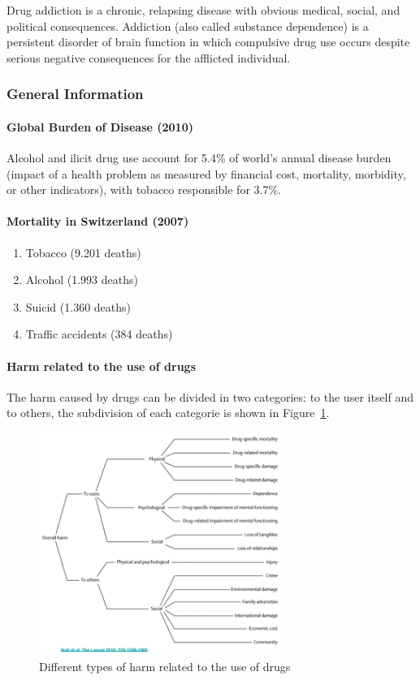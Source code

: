 \documentclass[12pt,article,oneside,a4paper]{memoir}
\begin{document}
Drug addiction is a chronic, relapsing disease with obvious medical, social,
and political consequences. Addiction (also called substance dependence) is a
persistent disorder of brain function in which compulsive drug use occurs
despite serious negative consequences for the afflicted individual.

\subsubsection{General Information}
\paragraph{Global Burden of Disease (2010)}
Alcohol and ilicit drug use account for 5.4\% of world's annual disease burden
(impact of a health problem as measured by financial cost, mortality,
morbidity, or other indicators), with tobacco responsible for 3.7\%.

\paragraph{Mortality in Switzerland (2007)}
\begin{enumerate}
\item Tobacco (9.201 deaths)
\item Alcohol (1.993 deaths)
\item Suicid (1.360 deaths)
\item Traffic accidents (384 deaths)
\end{enumerate}

\paragraph{Harm related to the use of drugs}
The harm caused by drugs can be divided in two categories: to the user itself
and to others, the subdivision of each categorie is shown in Figure~\ref{fig:harm-drugs}.

\begin{figure}
  \centering
  \includegraphics[width=0.7\textwidth]{imgs/harm-drugs.png}
  \caption{Different types of harm related to the use of drugs}
  \label{fig:harm-drugs}
\end{figure}
\end{document}
